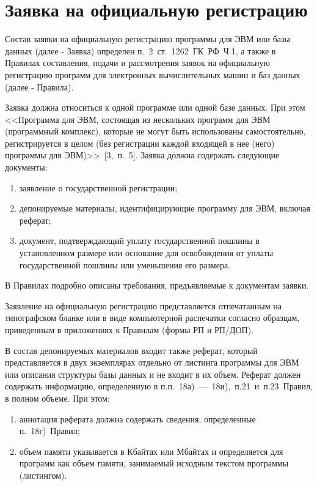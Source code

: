 \section{Заявка на официальную регистрацию}

Состав заявки на официальную регистрацию программы для ЭВМ или базы данных (далее - Заявка) определен
п.~2~ст.~1262~ГК~РФ~Ч.1, а также в Правилах составления, подачи и рассмотрения заявок на официальную
регистрацию программ для электронных вычислительных машин и баз данных (далее - Правила).

Заявка должна относиться к одной программе или одной базе данных.
При этом <<Программа для ЭВМ, состоящая из нескольких программ для ЭВМ (программный комплекс),
которые не могут быть использованы самостоятельно, регистрируется в целом (без регистрации каждой
входящей в нее (него) программы для ЭВМ)>>~[3,~п.~5]. Заявка должна содержать следующие документы:
\begin{enumerate}
\item заявление о государственной регистрации;
\item депонируемые материалы, идентифицирующие программу для ЭВМ, включая реферат;
\item документ, подтверждающий уплату государственной пошлины в установленном размере или
основание для освобождения от уплаты государственной пошлины или уменьшения его размера.
\end{enumerate}

В Правилах подробно описаны требования, предъявляемые к документам заявки.

Заявление на официальную регистрацию представляется отпечатанным на типографском бланке или в виде
компьютерной распечатки согласно образцам, приведенным в приложениях к Правилам (формы РП и РП/ДОП).

В состав депонируемых материалов входит также реферат, который представляется в двух экземплярах отдельно
от листинга программы для ЭВМ или описания структуры базы данных и не входит в их объем.
Реферат должен содержать информацию, определенную в п.п.~18а)~---~18и),~п.21~и~п.23~Правил,
в полном объеме. При этом:
\begin{enumerate}
\item аннотация реферата должна содержать сведения, определенные п.~18г)~Правил;
\item объем памяти указывается в Кбайтах или Мбайтах и определяется для программ как объем памяти,
занимаемый исходным текстом программы (листингом).
\end{enumerate}

